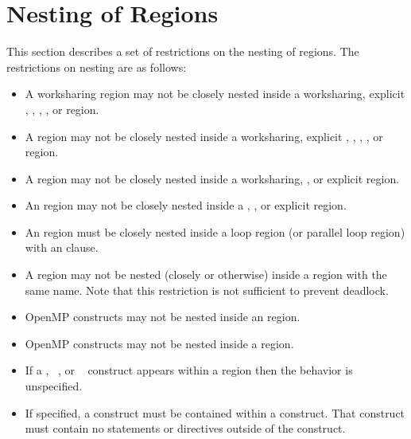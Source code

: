 \section{Nesting of Regions}
\label{sec:Nesting of Regions}
This section describes a set of restrictions on the nesting of regions. The restrictions on 
nesting are as follows:

\begin{itemize}
\item A worksharing region may not be closely nested inside a worksharing, explicit , 
, , , or  region.

\item A  region may not be closely nested inside a worksharing, explicit , 
, , , or  region.

\item A  region may not be closely nested inside a worksharing, , or 
explicit  region.

\item An  region may not be closely nested inside a , , or 
explicit  region. 

\item An  region must be closely nested inside a loop region (or parallel loop 
region) with an  clause.

\item A  region may not be nested (closely or otherwise) inside a  
region with the same name. Note that this restriction is not sufficient to prevent 
deadlock.

\item OpenMP constructs may not be nested inside an  region.

\item OpenMP constructs may not be nested inside a  region.

\item If a , ~, or ~ construct appears within a 
 region then the behavior is unspecified. 

\item If specified, a  construct must be contained within a  construct. That 
 construct must contain no statements or directives outside of the  
construct. 


\end{itemize}
